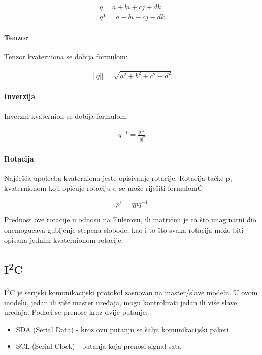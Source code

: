 \documentclass[../Document.tex]{subfiles}
\begin{document}
\begin{align*}
    q=a + bi + cj + dk \\
    q*=a - bi - cj - dk
\end{align*}

\paragraph{Tenzor}
Tenzor kvaterniona se dobija formulom:

\begin{align*}
    ||q||=\sqrt{a^2 + b^2 + c^2 + d^2}
\end{align*}

\paragraph{Inverzija}
Inverzni kvaternion se dobija formulom:

\begin{align*}
    q^{-1}=\frac{q*}{|q|^2}
\end{align*}

\paragraph{Rotacija}
Najćešća upotreba kvaterniona jeste opisivanje rotacije. Rotacija tačke p, kvaternionom koji opicuje rotaciju q se može riješiti formulomČ

$$p'=qpq^{-1}$$

\noindent Prednost ove rotacije u odnosu na Eulerovu, ili matričnu je ta što imaginarni dio onemogućava gubljenje stepena slobode, kao i to što svaka rotacija može biti opisana jednim kvaternionom rotacije.

\newcommand{\itc}{I\textsuperscript{2}C}
\subsection{\itc}
{\itc} je serijski komunikacijski protokol zasnovan na master/slave modelu. U ovom modelu, jedan ili više master uređaja, mogu kontrolirati jedan ili više slave uređaja. Podaci se prenose kroz dvije putanje:

\begin{itemize}
    \item SDA (Serial Data) - kroz ovu putanju se šalju komunikacijski paketi
    \item SCL (Serial Clock) - putanja koja prenosi signal sata
\end{itemize}
\end{document}
